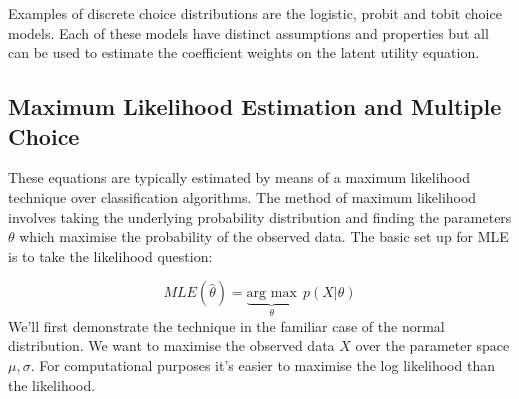 \documentclass[]{tufte-book}
\theoremstyle{definition}
\theoremstyle{definition}
\theoremstyle{definition}
\theoremstyle{remark}
\begin{document}
Examples of discrete choice distributions are the logistic, probit and tobit choice models. Each of these models have distinct assumptions and properties but all can be used to estimate the coefficient weights on the latent utility equation.

\hypertarget{maximum-likelihood-estimation-and-multiple-choice}{%
\subsection{Maximum Likelihood Estimation and Multiple Choice}\label{maximum-likelihood-estimation-and-multiple-choice}}

These equations are typically estimated by means of a maximum likelihood technique over classification algorithms. The method of maximum likelihood involves taking the underlying probability distribution and finding the parameters \(\theta\) which maximise the probability of the observed data. The basic set up for MLE is to take the likelihood question:

\[ MLE(\hat{\theta}) = \underbrace{\text{arg max}}_{\theta} \ \ p(X | \theta) \] We'll first demonstrate the technique in the familiar case of the normal distribution. We want to maximise the observed data \(X\) over the parameter space \(\mu, \sigma\). For computational purposes it's easier to maximise the log likelihood than the likelihood.
\end{document}
